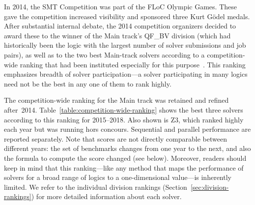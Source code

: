 \documentclass[dvipsnames,table,twoside,11pt]{article}
\begin{document}
In 2014, the SMT Competition was part of the FLoC Olympic Games.
These gave the competition increased visibility and sponsored three
Kurt G\"odel medals.  After substantial internal debate, the 2014
competition organizers decided to award these to the winner of the
Main track's QF\_BV division (which had historically been the logic
with the largest number of solver submissions and job pairs), as well
as to the two best Main-track solvers according to a competition-wide
ranking that had been instituted especially for this
purpose~\cite{CDW14}.  This ranking emphasizes breadth of solver
participation---a solver participating in many logics need not be the
best in any one of them to rank highly.

The competition-wide ranking for the Main track was retained and
refined after~2014.  Table~\ref{table:competition-wide-ranking} shows
the best three solvers according to this ranking for 2015--2018.  Also
shown is Z3, which ranked highly each year but was running hors
concours.  Sequential and parallel performance are reported
separately.
%
Note that scores are not directly comparable between different years:
the set of benchmarks changes from one year to the next, and also the
formula to compute the score changed (see below).  Moreover, readers
should keep in mind that this ranking---like any method that maps the
performance of solvers for a broad range of logics to a
one-dimensional value---is inherently limited.  We refer to the
individual division rankings (Section~\ref{sec:division-rankings}) for
more detailed information about each solver.
\end{document}
